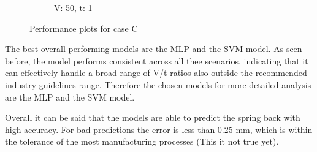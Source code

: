 \begin{figure}[H]
\begin{tcolorbox}[arc=0pt,boxrule=0.5pt]
\begin{subfigure}{0.5\textwidth}
            \caption{V: 50, t: 1}
            \label{fig:performance-50_1}
        \end{subfigure}
    \end{tcolorbox}
    \caption{Performance plots for case C}
    \label{fig:performance-case-c}
\end{figure}

The best overall performing models are the \ac{MLP} and the \ac{SVM} model.
As seen before, the model performs consistent across all thee scenarios, indicating that it can
effectively handle a broad range of V/t ratios also outside the recommended industry guidelines
range.
Therefore the chosen models for more detailed analysis are the \ac{MLP} and the \ac{SVM} model.

Overall it can be said that the models are able to predict the spring back with high accuracy.
For bad predictions the error is less than 0.25 mm, which is within the tolerance of the
most manufacturing processes (This it not true yet).